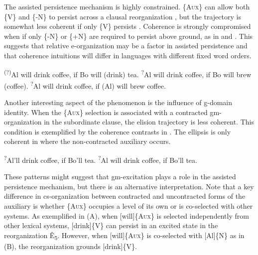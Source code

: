  The assisted persistence mechanism is highly constrained. \{A\textsc{ux}\} can allow both \{V\} and \{-N\} to persist across a clausal reorganization , but the trajectory is somewhat less coherent if only \{V\} persists . Coherence is strongly compromised when if only \{-N\} or \{+N\} are required to persist above ground, as in  and . This suggests that relative e-organization may be a factor in assisted persistence and that coherence intuitions will differ in languages with different fixed word orders. 

\ea\label{ex:7:4}
\label{ex:7:4a} \ex\label{ex:7:4b}\textsuperscript{(?)}Al will drink coffee, if Bo will (drink) tea.
\ex\label{ex:7:4c}\textsuperscript{?}Al will drink coffee, if Bo will brew (coffee).
\ex\label{ex:7:4d}\textsuperscript{?}Al will drink coffee, if (Al) will brew coffee.
\z
\z

  Another interesting aspect of the phenomenon is the influence of g-domain identity. When the \{A\textsc{ux}\} selection is associated with a contracted gm-organization in the subordinate clause, the elision trajectory is less coherent. This condition is exemplified by the coherence contrasts in . The ellipsis is only coherent in  where the non-contracted auxiliary occurs.

\ea\label{ex:7:5}
\ea\label{ex:7:5a}\textsuperscript{?}Al’ll drink coffee, if Bo’ll tea.      
\ex\label{ex:7:5b}\textsuperscript{?}Al will drink coffee, if Bo’ll tea.
\label{ex:7:5c}
\z
\z

  These patterns might suggest that gm-excitation plays a role in the assisted persistence mechanism, but there is an alternative interpretation. Note that a key difference in cs-organization between contracted and uncontracted forms of the auxiliary is whether \{A\textsc{ux}\} occupies a level of its own or is co-selected with other systems. As exemplified in {}(A), when [will]\{A\textsc{ux}\} is selected independently from other lexical systems, [drink]\{V\} can persist in an excited state in the reorganization Ê\textsubscript{5}. However, when [will]\{A\textsc{ux}\} is co-selected with [Al]\{N\} as in {}(B), the reorganization grounds [drink]\{V\}.

